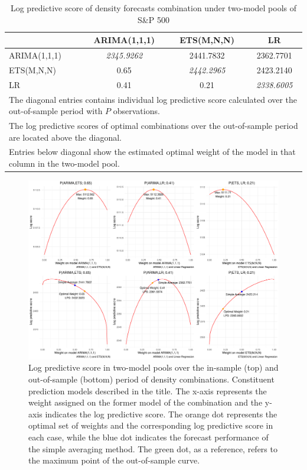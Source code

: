 \documentclass{monashthesis}
\begin{document}
\begin{table}[ht]
  \centering
  \caption{Log predictive score of density forecasts combination under two-model pools of S\&P 500}
    \begin{tabular}{lccc}
    \toprule
                 & ARIMA(1,1,1)       & ETS(M,N,N)         & LR \\
    \midrule
    ARIMA(1,1,1) & \textit{2345.9262} & 2441.7832          & 2362.7701 \\
    ETS(M,N,N)   & 0.65               & \textit{2442.2965} & 2423.2140 \\
    LR           & 0.41               & 0.21               & \textit{2338.6005} \\
    \bottomrule
    \multicolumn{4}{l}{\footnotesize The diagonal entries contains individual log predictive score calculated over the out-of-sample period with $P$ observations.}\\
    \multicolumn{4}{l}{\footnotesize The log predictive scores of optimal combinations over the out-of-sample period are located above the diagonal.}\\
    \multicolumn{4}{l}{\footnotesize Entries below diagonal show the estimated optimal weight of the model in that column in the two-model pool.}\\
    \end{tabular}
  \label{tab:2}
\end{table}

\begin{figure}[ht]
\centering
\includegraphics[scale=0.4]{figures/SP500_nonstationary.pdf}
\caption{Log predictive score in two-model pools over the in-sample (top) and out-of-sample (bottom) period of density combinations. Constituent prediction models described in the title. The x-axis represents the weight assigned on the former model of the combination and the y-axis indicates the log predictive score. The orange dot represents the optimal set of weights and the corresponding log predictive score in each case, while the blue dot indicates the forecast performance of the simple averaging method. The green dot, as a reference, refers to the maximum point of the out-of-sample curve.}
\label{fig:nonstat}
\end{figure}
\end{document}
